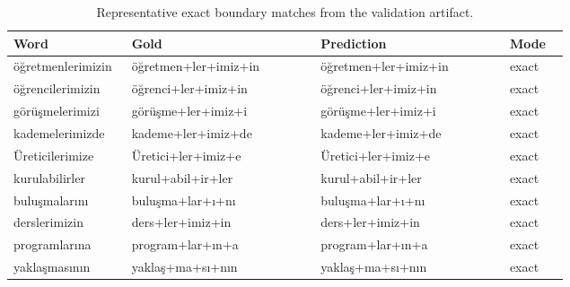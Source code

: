 \documentclass[11pt]{article}
\begin{document}
\begin{table}[h]
\centering
\caption{Representative exact boundary matches from the validation artifact.}
\label{tab:extended-correct}
\small
\begin{tabular}{p{0.20\linewidth}p{0.32\linewidth}p{0.32\linewidth}p{0.10\linewidth}}
\toprule
Word & Gold & Prediction & Mode \\
\midrule
öğretmenlerimizin & öğretmen+ler+imiz+in & öğretmen+ler+imiz+in & exact \\
öğrencilerimizin & öğrenci+ler+imiz+in & öğrenci+ler+imiz+in & exact \\
görüşmelerimizi & görüşme+ler+imiz+i & görüşme+ler+imiz+i & exact \\
kademelerimizde & kademe+ler+imiz+de & kademe+ler+imiz+de & exact \\
Üreticilerimize & Üretici+ler+imiz+e & Üretici+ler+imiz+e & exact \\
kurulabilirler & kurul+abil+ir+ler & kurul+abil+ir+ler & exact \\
buluşmalarını & buluşma+lar+ı+nı & buluşma+lar+ı+nı & exact \\
derslerimizin & ders+ler+imiz+in & ders+ler+imiz+in & exact \\
programlarına & program+lar+ın+a & program+lar+ın+a & exact \\
yaklaşmasının & yaklaş+ma+sı+nın & yaklaş+ma+sı+nın & exact \\
\bottomrule
\end{tabular}
\end{table}
\end{document}
